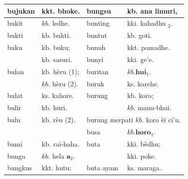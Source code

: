 \documentclass[10pt]{article}
\begin{document}
\begin{center}
\begin{tabular}{|l|l|l|l|}
\hline
bujukan & kkt. bhoke. & bungsu & kb. ana limuri, \\
\hline
bukit & \(k b\). ledhe. & bunting & kki. kahadhu \({ }_{2}\). \\
\hline
bukti & kb. bukti. & buntut & kb. goti. \\
\hline
buku & kb. buku; & bunuh & kkt. pamadhe. \\
\hline
 & kb. sasuri. & bunyi & kki. ge'e. \\
\hline
bulan & kb. hèru (1); & buritan & \(k b . \mathbf{h u i}_{1}\). \\
\hline
 & \(k b\). hèru (2). & buruk & ks. karehe. \\
\hline
bulat & ks. kahore. & burung & kb. koro; \\
\hline
bulir & kb. huri. &  & \(k b\). manu-bhui. \\
\hline
bulu & kb. rèu (2). & \multicolumn{2}{|c|}{burung merpati \(k b\). koro èi ci'u.} \\
\hline
\multicolumn{2}{|c|}{} & busa & \(k b . \mathbf{h o r o}_{1}\). \\
\hline
bumi & kb. rai-haha. & buta & kki. bèdhu; \\
\hline
bunga & \(k b\). hela \(\mathbf{a}_{2}\). &  & kki. poke. \\
\hline
bungkus & kkt. hutu; & buta ayam & ks. maraga. \\
\hline
\end{tabular}
\end{center}
\end{document}
